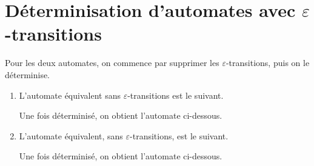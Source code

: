 \section{Déterminisation d'automates avec $\varepsilon$-transitions}

Pour les deux automates, on commence par supprimer les $\varepsilon$-transitions, puis on le déterminise.

\begin{enumerate}
	\item L'automate équivalent sans $\varepsilon$-transitions est le suivant.
		\begin{figure}[H]
			\centering
		\end{figure}
		Une fois déterminisé, on obtient l'automate ci-dessous.
		\begin{figure}[H]
			\centering
		\end{figure}
	\item L'automate équivalent, sans $\varepsilon$-transitions, est le suivant.
		\begin{figure}[H]
			\centering
		\end{figure}
		Une fois déterminisé, on obtient l'automate ci-dessous.
		\begin{figure}[H]
			\centering
		\end{figure}
\end{enumerate}

